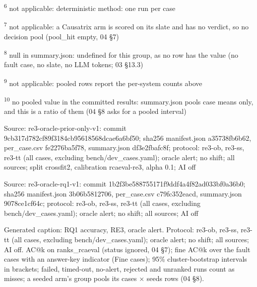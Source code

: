 \textsuperscript{6} not applicable: deterministic method: one run per case\par
\textsuperscript{7} not applicable: a Causatrix arm is scored on its slate and has no verdict, so no decision pool (pool\_hit empty, 04 \S{}7)\par
\textsuperscript{8} null in summary.json: undefined for this group, as no row has the value (no fault case, no slate, no LLM tokens; 03 \S{}13.3)\par
\textsuperscript{9} not applicable: pooled rows report the per-system counts above\par
\textsuperscript{10} no pooled value in the committed results: summary.json pools case means only, and this is a ratio of them (04 \S{}8 asks for a pooled interval)\par
\noindent Source: re3-oracle-prior-only-v1: commit 9cb317d782cf89f3184cb95618568dcae6a6bf50; sha256 manifest.json a35738fb6b62, per\_case.csv fe2276ba5f78, summary.json df3e2fbafc8f; protocol: re3-ob, re3-ss, re3-tt (all cases, excluding bench/\allowbreak{}dev\_cases.yaml); oracle alert; no shift; all sources; split crossfit2, calibration rcaeval-re3, alpha 0.1; AI off\par
\noindent Source: re3-oracle-rq1-v1: commit 1b2f3be588755171f9ddf4a4f82ad033bf0a36b0; sha256 manifest.json 3b06b5812706, per\_case.csv c79fc352eacd, summary.json 9078ce1cf64c; protocol: re3-ob, re3-ss, re3-tt (all cases, excluding bench/\allowbreak{}dev\_cases.yaml); oracle alert; no shift; all sources; AI off\par
\noindent Generated caption: RQ1 accuracy, RE3, oracle alert. Protocol: re3-ob, re3-ss, re3-tt (all cases, excluding bench/\allowbreak{}dev\_cases.yaml); oracle alert; no shift; all sources; AI off. AC@k on ranks\_rcaeval (status ignored, 04 \S{}7); fine AC@k over the fault cases with an answer-key indicator (Fine cases); 95\% cluster-bootstrap intervals in brackets; failed, timed-out, no-alert, rejected and unranked runs count as misses; a seeded arm's group pools its cases $\times$ seeds rows (04 \S{}8).\par
\endgroup
